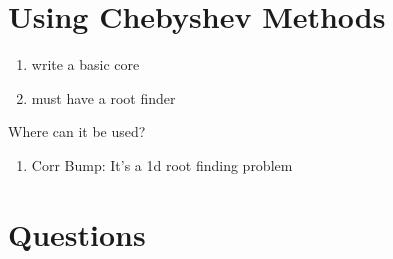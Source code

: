 \documentclass{amsart}
\theoremstyle{plain}
\numberwithin{equation}{section}
\begin{document}
\section{Using Chebyshev Methods}
\begin{enumerate}
\item write a basic core
\item must have a root finder
\end{enumerate}

Where can it be used?
\begin{enumerate}
\item Corr Bump: It's a 1d root finding problem
\end{enumerate}

\section*{Questions}
\end{document}
